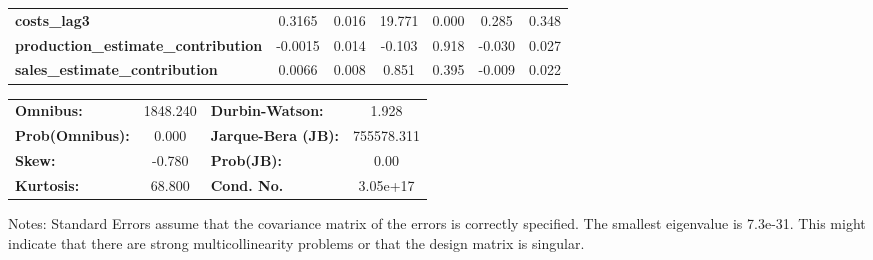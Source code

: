 \begin{center}
\begin{tabular}{lcccccc}
\textbf{costs\_lag3}                        &       0.3165  &        0.016     &    19.771  &         0.000        &        0.285    &        0.348     \\
\textbf{production\_estimate\_contribution} &      -0.0015  &        0.014     &    -0.103  &         0.918        &       -0.030    &        0.027     \\
\textbf{sales\_estimate\_contribution}      &       0.0066  &        0.008     &     0.851  &         0.395        &       -0.009    &        0.022     \\
\bottomrule
\end{tabular}
\begin{tabular}{lclc}
\textbf{Omnibus:}       & 1848.240 & \textbf{  Durbin-Watson:     } &     1.928   \\
\textbf{Prob(Omnibus):} &   0.000  & \textbf{  Jarque-Bera (JB):  } & 755578.311  \\
\textbf{Skew:}          &  -0.780  & \textbf{  Prob(JB):          } &      0.00   \\
\textbf{Kurtosis:}      &  68.800  & \textbf{  Cond. No.          } &  3.05e+17   \\
\bottomrule
\end{tabular}
\end{center}

Notes: \newline
 [1] Standard Errors assume that the covariance matrix of the errors is correctly specified. \newline
 [2] The smallest eigenvalue is 7.3e-31. This might indicate that there are \newline
 strong multicollinearity problems or that the design matrix is singular.